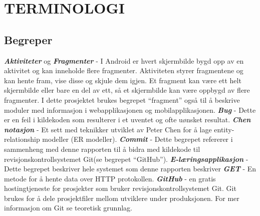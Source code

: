 \documentclass[../main.tex]{subfiles}
\begin{document}
\chapter*{TERMINOLOGI}

\section*{Begreper}

\textbf{\textit{Aktiviteter}} og \textbf{\textit{Fragmenter}} - I Android er hvert skjermbilde bygd opp av en aktivitet og kan inneholde flere fragmenter. Aktiviteten styrer fragmentene og kan hente fram, vise disse og skjule dem igjen. Et fragment kan være ett helt skjermbilde eller bare en del av ett, så et skjermbilde kan være oppbygd av flere fragmenter.  I dette prosjektet brukes begrepet “fragment” også til å beskrive moduler med informasjon i webapplikasjonen og mobilapplikasjonen. \newline
\newline
\textbf{\textit{Bug}} - Dette er en feil i kildekoden som resulterer i et uventet og ofte uønsket resultat.\newline
\newline
\textbf{\textit{Chen notasjon}} - Et sett med teknikker utviklet av Peter Chen for å lage entity-relationship modeller (ER modeller). \newline
\newline
\textbf{\textit{Commit}} - Dette begrepet refererer i sammenheng med denne rapporten til å bidra med kildekode til revisjonskontrollsystemet Git(se begrepet “GitHub”). \newline
\newline
\textbf{\textit{E-læringsapplikasjon}} - Dette begrepet beskriver hele systemet som denne rapporten beskriver\newline
\newline
\textbf{\textit{GET}} - En metode for å hente data over HTTP protokollen.    \newline
\newline
\textbf{\textit{GitHub}} - en gratis hostingtjeneste for prosjekter som bruker revisjonskontrollsystemet Git. Git brukes for å dele prosjektfiler mellom utviklere under produksjonen. For mer informasjon om Git se teoretisk grunnlag.\newline
\end{document}
